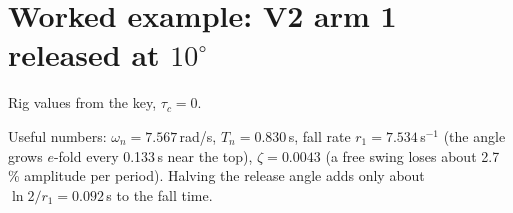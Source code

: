\documentclass[10pt]{article}
\begin{document}
\section{Worked example: V2 arm 1 released at $10^\circ$}
Rig values from the key, $\tau_c=0$.
\begin{center}
\small
\end{center}
\begin{table}[h]
\centering\small
\caption{Fall time against release angle (V2 arm 1, rig $b$). The middle column is the exact frictionless formula \eqref{eq:elliptic}; the rig's $b$ adds only 0.1--3\,ms.}
\label{tab:fall}

\end{table}

\noindent Useful numbers: $\omega_n=7.567$\,rad/s, $T_n=0.830$\,s, fall rate $r_1=7.534$\,s$^{-1}$ (the angle grows $e$-fold every 0.133\,s near the top), $\zeta=0.0043$ (a free swing loses about 2.7\,\% amplitude per period). Halving the release angle adds only about $\ln2/r_1=0.092$\,s to the fall time.

\end{document}
